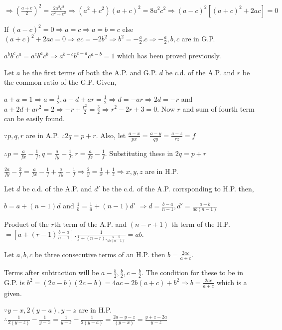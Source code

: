   $\Rightarrow \left(\frac{a + c}{2}\right)^2 = \frac{2a^2c^2}{a^2 + c^2} \Rightarrow (a^2 + c^2)(a + c)^2 =
  8a^2c^2 \Rightarrow (a - c)^2[(a + c)^2 + 2ac] = 0$

  If $(a - c)^2 = 0 \Rightarrow a = c \Rightarrow a = b = c$ else $(a + c)^2 + 2ac = 0 \Rightarrow ac =
  -2b^2 \Rightarrow b^2 = -\frac{a}{2}.c \Rightarrow -\frac{a}{2}, b, c$ are in G.P.
\item  $a^bb^cc^a = a^cb^ac^b  \Rightarrow a^{b - c}b^{c - a}c^{a - b} = 1$ which has been proved
  previously.
\item Let $a$ be the first terms of both the A.P. and G.P. $d$ be c.d. of the A.P. and $r$ be the common
  ratio of the G.P. Given,

  $a + a = 1 \Rightarrow a = \frac{1}{2}, a + d + ar = \frac{1}{2} \Rightarrow d = -ar \Rightarrow 2d = -r$
  and $a + 2d + ar^2 = 2 \Rightarrow -r + \frac{r^2}{2} = \frac{3}{2} \Rightarrow r^2 -2r + 3 = 0$. Now $r$
  and sum of fourth term can be easily found.
\item $\because p, q, r$ are in A.P. $\therefore 2q = p + r$. Also, let $\frac{a - x}{px} = \frac{a - y}{qy}
  = \frac{a - z}{rz} = f$

  $\therefore p = \frac{a}{fx} - \frac{1}{f}, q = \frac{a}{fy} - \frac{1}{f}, r = \frac{a}{fz}-
  \frac{1}{f}$. Substituting these in $2q = p + r$

  $\frac{2a}{fy} - \frac{2}{f} = \frac{a}{fx} - \frac{1}{f} + \frac{a}{fy} - \frac{1}{f} \Rightarrow
  \frac{2}{y} = \frac{1}{x} + \frac{1}{z} \Rightarrow x, y, z$ are in H.P.
\item Let $d$ be c.d. of the A.P. and $d'$ be the c.d. of the A.P. corrsponding to H.P. then,

  $b = a + (n - 1)d$ and $\frac{1}{b} = \frac{1}{a} + (n - 1)d'$ $\Rightarrow d = \frac{b - a}{n - 1}, d' =
  \frac{a - b}{ab(n - 1)}$

  Product of the $r$th term of the A.P. and $(n - r + 1)$ th term of the H.P. $= \left[a + (r -
    1)\frac{b - a}{n - 1}\right].\frac{1}{\frac{1}{a} + (n - r).\frac{a - b}{ab(n - 1)}} = ab$.
\item Let $a, b, c$ be three consecutive terms of an H.P. then $b = \frac{2ac}{a + c}$.

  Terms after subtraction will be $a - \frac{b}{2}, \frac{b}{2}, c - \frac{b}{2}$. The condition for these
  to be in G.P. is $b^2 = (2a - b)(2c - b) = 4ac - 2b(a + c) + b^2 \Rightarrow b = \frac{2ac}{a + c}$ which
  is a given.
\item $\because y - x, 2(y - a), y - z$ are in H.P. $\therefore \frac{1}{2(y - z)} - \frac{1}{y - x} =
  \frac{1}{y - z} - \frac{1}{2(y - a)} = \frac{2a - y - z}{(y - x)} = \frac{y + z - 2a}{y - z}$


